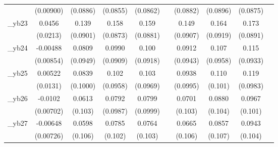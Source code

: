 \begin{table}[htbp]
\begin{tabular}{l*{9}{c}}
            &   (0.00900)         &    (0.0886)         &    (0.0855)         &    (0.0862)         &                     &    (0.0882)         &    (0.0896)         &    (0.0875)         &                     \\
[1em]
\_yb23       &      0.0456\sym{**} &       0.139         &       0.158\sym{*}  &       0.159\sym{*}  &                     &       0.149\sym{*}  &       0.164\sym{*}  &       0.173\sym{*}  &                     \\
            &    (0.0213)         &    (0.0901)         &    (0.0873)         &    (0.0881)         &                     &    (0.0907)         &    (0.0919)         &    (0.0891)         &                     \\
[1em]
\_yb24       &    -0.00488         &      0.0809         &      0.0990         &       0.100         &                     &      0.0912         &       0.107         &       0.115         &                     \\
            &   (0.00854)         &    (0.0949)         &    (0.0909)         &    (0.0918)         &                     &    (0.0943)         &    (0.0958)         &    (0.0933)         &                     \\
[1em]
\_yb25       &     0.00522         &      0.0839         &       0.102         &       0.103         &                     &      0.0938         &       0.110         &       0.119         &                     \\
            &    (0.0131)         &    (0.1000)         &    (0.0958)         &    (0.0969)         &                     &    (0.0995)         &     (0.101)         &    (0.0983)         &                     \\
[1em]
\_yb26       &     -0.0102         &      0.0613         &      0.0792         &      0.0799         &                     &      0.0701         &      0.0880         &      0.0967         &                     \\
            &   (0.00702)         &     (0.103)         &    (0.0987)         &    (0.0999)         &                     &     (0.103)         &     (0.104)         &     (0.101)         &                     \\
[1em]
\_yb27       &    -0.00648         &      0.0598         &      0.0785         &      0.0764         &                     &      0.0665         &      0.0857         &      0.0943         &                     \\
            &   (0.00726)         &     (0.106)         &     (0.102)         &     (0.103)         &                     &     (0.106)         &     (0.107)         &     (0.104)         &                     \\

\end{tabular}
\end{table}
